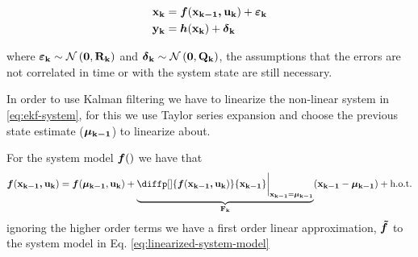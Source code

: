 \documentclass[12pt]{article}
\begin{document}
\begin{equation}
\begin{aligned}
    \boldsymbol{\mathbf{x_k}} &= {\boldsymbol{f}}(\boldsymbol{\mathbf{x_{k-1}, u_k}}) + {\boldsymbol{\varepsilon}}_\mathbf{k} \\
    \boldsymbol{\mathbf{y_k}} &= {\boldsymbol{h}}(\boldsymbol{\mathbf{x_{k}}}) + {\boldsymbol{\delta}}_\mathbf{k}
\end{aligned}
    \label{eq:ekf-system}
\end{equation}

where ${\boldsymbol{\varepsilon}}_\mathbf{k} \sim \mathcal{N}\left(\boldsymbol{\mathbf{0}}, \boldsymbol{\mathbf{R_k}}\right)$ and ${\boldsymbol{\delta}}_\mathbf{k} \sim \mathcal{N}\left(\boldsymbol{\mathbf{0}}, \boldsymbol{\mathbf{Q_k}}\right)$, the assumptions that the errors are not correlated in time or with the system state are still necessary.

In order to use Kalman filtering we have to linearize the non-linear system in \ref{eq:ekf-system}, for this we use Taylor series expansion and choose the previous state estimate ($\boldsymbol{\mathbf{\mu_{k-1}}}$) to linearize about.

For the system model ${\boldsymbol{f}}()$ we have that
\begin{equation*}
    \mb{f}(\bvec{x_{k-1}, u_k}) = \mb{f}(\bvec{\mu_{k-1}}, 
    \bvec{u_k}) + \underbrace{\diffp[]{\mb{f}(\bvec{x_{k-1}, u_k}) }
    {\bvec{x_{k-1}}}\bigg\rvert_{\bvec{x_{k-1}} = \bvec{\mu_{k-1}}}}_{\mat{F_k}} 
    (\bvec{x_{k-1}} - \bvec{\mu_{k-1}}) + \hot
\end{equation*}
ignoring the higher order terms we have a first order linear approximation, ${\boldsymbol{\tilde{f}}}$ to the system model in Eq. \ref{eq:linearized-system-model}
\end{document}
